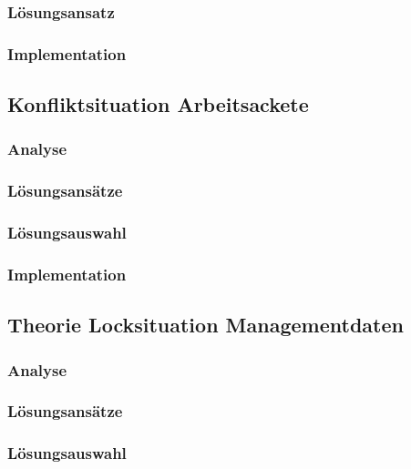 \subsubsection{L\"osungsansatz}

\subsubsection{Implementation}


\subsection{Konfliktsituation Arbeitsackete}
\subsubsection{Analyse}
\subsubsection{L\"osungsans\"atze}
\subsubsection{L\"osungsauswahl}

\subsubsection{Implementation}

\subsection{Theorie Locksituation Managementdaten}
\subsubsection{Analyse}
\subsubsection{L\"osungsans\"atze}
\subsubsection{L\"osungsauswahl}
